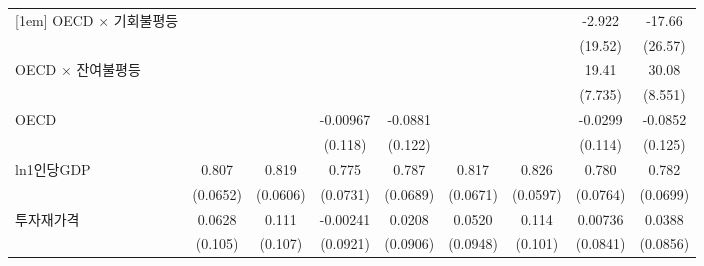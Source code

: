 \begin{table}[htbp]
{\begin{tabular}{l*{8}{c}}
[1em]
OECD $\times$ 기회불평등&                     &                     &                     &                     &                     &                     &      -2.922         & -17.66                            \\
                    &                     &                     &                     &                     &                     &                     &     (19.52)         &     (26.57)                       \\
[1em]                                                                                                                                                                                             
OECD $\times$ 잔여불평등&                     &                     &                     &                     &                     &                     &       19.41\sym{**} & 30.08\sym{***}                    \\
                    &                     &                     &                     &                     &                     &                     &     (7.735)         &     (8.551)                       \\
[1em]
OECD              &                     &                     &    -0.00967         &     -0.0881         &                     &                     &     -0.0299         &     -0.0852         \\
                    &                     &                     &     (0.118)         &     (0.122)         &                     &                     &     (0.114)         &     (0.125)         \\
[1em]
ln1인당GDP        &       0.807\sym{***}&       0.819\sym{***}&       0.775\sym{***}&       0.787\sym{***}&       0.817\sym{***}&       0.826\sym{***}&       0.780\sym{***}&       0.782\sym{***}\\
                    &    (0.0652)         &    (0.0606)         &    (0.0731)         &    (0.0689)         &    (0.0671)         &    (0.0597)         &    (0.0764)         &    (0.0699)         \\
[1em]
투자재가격        &      0.0628         &       0.111         &    -0.00241         &      0.0208         &      0.0520         &       0.114         &     0.00736         &      0.0388         \\
                    &     (0.105)         &     (0.107)         &    (0.0921)         &    (0.0906)         &    (0.0948)         &     (0.101)         &    (0.0841)         &    (0.0856)         \\

\end{tabular}}
\end{table}
